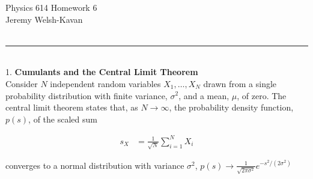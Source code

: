 \documentclass[]{article}
\begin{document}
{\Large Physics 614 Homework 6}\\
{Jeremy Welsh-Kavan}\\
\hfill \\
\noindent\rule{15cm}{0.4pt} \\

1. {\bf Cumulants and the Central Limit Theorem} \\

Consider $N$ independent random variables $X_1, \dots, X_N$ drawn from a single probability distribution with finite variance, $\sigma^2$, and a mean, $\mu$, of zero. The central limit theorem states that, as $N \to \infty$, the probability density function, $p(s)$, of the scaled sum 

\begin{equation}
\begin{aligned}
s_X & = \frac{1 }{ \sqrt{N} } \sum_{i=1}^{N} X_i
\end{aligned}
\end{equation}

converges to a normal distribution with variance $\sigma^2$, $p(s) \to \frac{1}{\sqrt{2\pi \sigma^2} }e^{- s^2 /(2\sigma^2)}$
\end{document}
